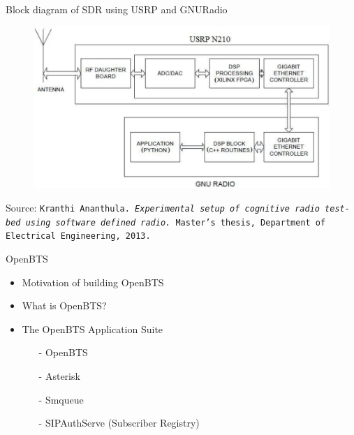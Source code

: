 \documentclass{beamer}
\begin{document}
  \begin{frame}{Block diagram of SDR using USRP and GNURadio}
    \begin{minipage}[t][0.8\textheight][t]{\textwidth}
      \begin{figure}
	\centering
	\includegraphics[width=\linewidth]{img/usrpGNURadioBlock}
      \end{figure}
      \vfill
      \tiny{Source: \texttt{Kranthi Ananthula. \emph{Experimental setup of cognitive radio test-bed using software
defined radio.} Master's thesis, Department of Electrical Engineering, 2013.}}
   \end{minipage}
  \end{frame}

  \begin{frame}{OpenBTS}
    \begin{itemize}
      \item Motivation of  building OpenBTS
      \item What is OpenBTS?
      \item The OpenBTS Application Suite
        \begin{itemize}
          \item[-] OpenBTS
          \item[-] Asterisk
          \item[-] Smqueue
          \item[-] SIPAuthServe (Subscriber Registry)
        \end{itemize}
    \end{itemize}
  \end{frame}
  
\end{document}
